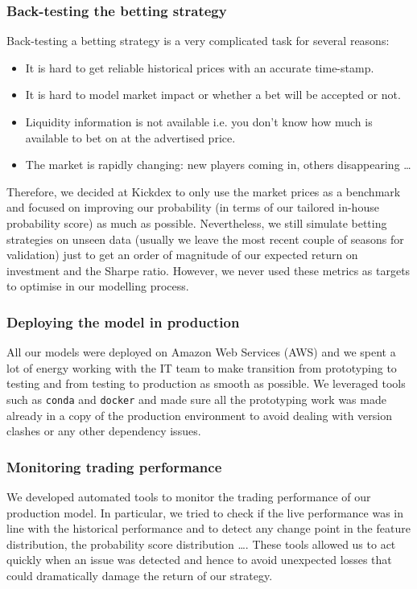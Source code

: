 \documentclass[11pt]{article}
\begin{document}
\subsubsection{Back-testing the betting strategy}
\label{sec:org0b929a5}
Back-testing a betting strategy is a very complicated task for several reasons: 
\begin{itemize}
\item It is hard to get reliable historical prices with an accurate time-stamp.
\item It is hard to model market impact or whether a bet will be accepted or not.
\item Liquidity information is not available i.e. you don't know how much is
available to bet on at the advertised price.
\item The market is rapidly changing: new players coming in, others disappearing
\ldots{}
\end{itemize}

Therefore, we decided at Kickdex to only use the market prices as a
benchmark and focused on improving our probability (in terms of our tailored
in-house probability score) as much as possible. Nevertheless, we still
simulate betting strategies on unseen data (usually we leave the most recent couple of
seasons for validation) just to get an order of magnitude of our expected
return on investment and the Sharpe ratio. However, we never used these metrics
as targets to optimise in our modelling process.
\subsubsection{Deploying the model in production}
\label{sec:org8808515}
All our models were deployed on Amazon Web Services (AWS) and we spent a lot
of energy working with the IT team to make transition from prototyping to
testing and from testing to production as smooth as possible. We leveraged
tools such as \texttt{conda} and \texttt{docker} and made sure all the prototyping work was
made already in a copy of the production environment to avoid dealing with
version clashes or any other dependency issues.
\subsubsection{Monitoring trading performance}
\label{sec:orgfe96b79}
We developed automated tools to monitor the trading performance of our
production model. In particular, we tried to check if the live performance
was in line with the historical performance and to detect any change point
in the feature distribution, the probability score distribution \ldots{}. These
tools allowed us to act quickly when an issue was detected and hence to
avoid unexpected losses that could dramatically damage the return of our
strategy.
\end{document}
